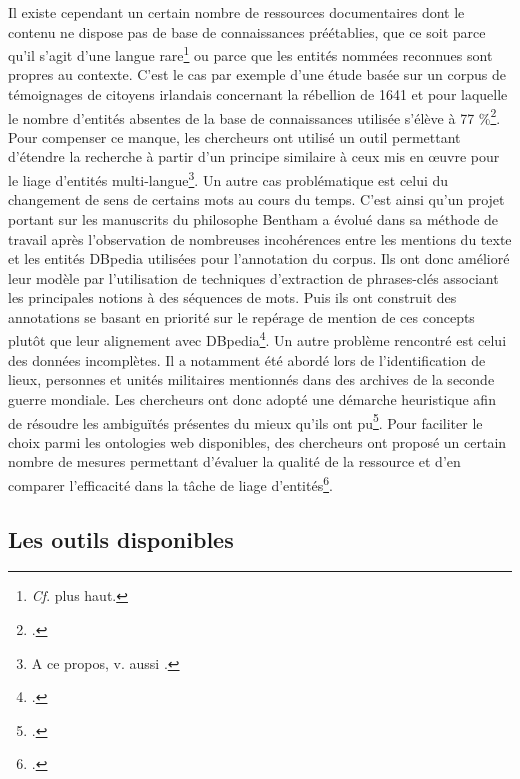\documentclass[a4paper,12pt,twoside]{book}
\begin{document}
	Il existe cependant un certain nombre de ressources documentaires dont le contenu ne dispose pas de base de connaissances préétablies, que ce soit parce qu'il s'agit d'une langue rare\footnote{\textit{Cf}. plus haut.} ou parce que les entités nommées reconnues sont propres au contexte. C'est le cas par exemple d'une étude basée sur un corpus de témoignages de citoyens irlandais concernant la rébellion de 1641 et pour laquelle le nombre d'entités absentes de la base de connaissances utilisée s'élève à 77 \%\footcite{munnelly_investigating_2018}. Pour compenser ce manque, les chercheurs ont utilisé un outil permettant d'étendre la recherche à partir d'un principe similaire à ceux mis en œuvre pour le liage d'entités multi-langue\footnote{A ce propos, v. aussi \cite{mika_agdistis_2014}.}. Un autre cas problématique est celui du changement de sens de certains mots au cours du temps. C'est ainsi qu'un projet portant sur les manuscrits du philosophe Bentham a évolué dans sa méthode de travail après l'observation de nombreuses incohérences entre les mentions du texte et les entités DBpedia utilisées pour l'annotation du corpus. Ils ont donc amélioré leur modèle par l'utilisation de techniques d'extraction de phrases-clés associant les principales notions à des séquences de mots. Puis ils ont construit des annotations se basant en priorité sur le repérage de mention de ces concepts plutôt que leur alignement avec DBpedia\footcite{ruiz_mapping_2019}. Un autre problème rencontré est celui des données incomplètes. Il a notamment été abordé lors de l'identification de lieux, personnes et unités militaires mentionnés dans des archives de la seconde guerre mondiale. Les chercheurs ont donc adopté une démarche heuristique afin de résoudre les ambiguïtés présentes du mieux qu'ils ont pu\footcite{heino_named_2017}. Pour faciliter le choix parmi les ontologies web disponibles, des chercheurs ont proposé un certain nombre de mesures permettant d'évaluer la qualité de la ressource et d'en comparer l'efficacité dans la tâche de liage d'entités\footcite{abadie_evaluation_2017}.
	
	\subsection{Les outils disponibles}
	
\end{document}
